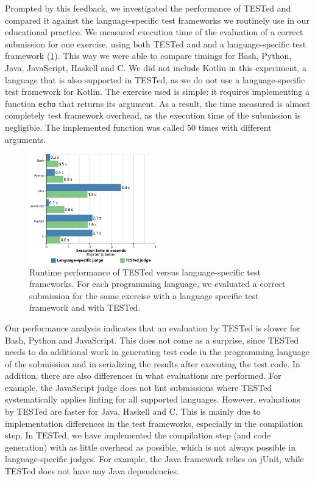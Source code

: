 \documentclass[../main]{subfiles}
\begin{document}
Prompted by this feedback, we investigated the performance of TESTed and compared it against the language-specific test frameworks we routinely use in our educational practice.
We measured execution time of the evaluation of a correct submission for one exercise, using both TESTed and and a language-specific test framework (\cref{fig:performance}).
This way we were able to compare timings for Bash, Python, Java, JavaScript, Haskell and C\@.
We did not include Kotlin in this experiment, a language that is also supported in TESTed, as we do not use a language-specific test framework for Kotlin.
The exercise used is simple: it requires implementing a function \texttt{echo} that returns its argument.
As a result, the time measured is almost completely test framework overhead, as the execution time of the submission is negligible.
The implemented function was called 50 times with different arguments.

\begin{figure}[t]
    \centering
    \includegraphics[width=0.5\textwidth]{performance}
    \caption{Runtime performance of TESTed versus language-specific test frameworks. For each programming language, we evaluated a correct submission for the same exercise with a language specific test framework and with TESTed.}
    \label{fig:performance}
\end{figure}

Our performance analysis indicates that an evaluation by TESTed is slower for Bash, Python and JavaScript.
This does not come as a surprise, since TESTed needs to do additional work in generating test code in the programming language of the submission and in serializing the results after executing the test code.
In addition, there are also differences in what evaluations are performed.
For example, the JavaScript judge does not lint submissions where TESTed systematically applies linting for all supported languages.
However, evaluations by TESTed are faster for Java, Haskell and C.
This is mainly due to implementation differences in the test frameworks, especially in the compilation step.
In TESTed, we have implemented the compilation step (and code generation) with as little overhead as possible, which is not always possible in language-specific judges.
For example, the Java framework relies on jUnit, while TESTed does not have any Java dependencies.
\end{document}
